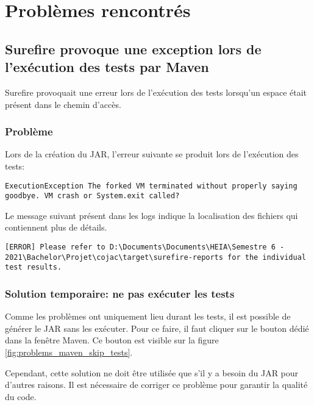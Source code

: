 
\chapter{Problèmes rencontrés}

\section{Surefire provoque une exception lors de l'exécution des tests par Maven}

Surefire provoquait une erreur lors de l'exécution des tests lorsqu'un espace était présent dans le chemin d'accès.

\subsection{Problème}
\label{sec:problems_surefire_problem}

Lors de la création du JAR, l'erreur suivante se produit lors de l'exécution des tests:

\begin{verbatim}
ExecutionException The forked VM terminated without properly saying goodbye. VM crash or System.exit called?
\end{verbatim}

Le message suivant présent dans les logs indique la localisation des fichiers qui contiennent plus de détails.
\begin{verbatim}
[ERROR] Please refer to D:\Documents\Documents\HEIA\Semestre 6 - 2021\Bachelor\Projet\cojac\target\surefire-reports for the individual test results.
\end{verbatim}

\subsection{Solution temporaire: ne pas exécuter les tests}

Comme les problèmes ont uniquement lieu durant les tests, il est possible de générer le JAR sans les exécuter.  Pour ce faire, il faut cliquer sur le bouton dédié dans la fenêtre Maven. Ce bouton est visible sur la figure \ref{fig:problems_maven_skip_tests}.

Cependant, cette solution ne doit être utilisée que s'il y a besoin du JAR pour d'autres raisons. Il est nécessaire de corriger ce problème pour garantir la qualité du code.


